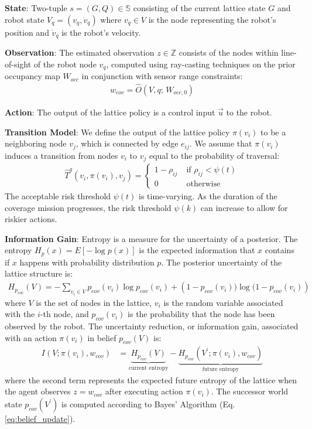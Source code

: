 \documentclass{article}
\newcommand{\ph}[1]{{\textbf{#1}:}} %
\begin{document}
\ph{State} Two-tuple $s=(G, Q)  \in \mathbb{S}$ consisting of the current lattice state $G$ and robot state $V_q = (v_q, \dot{v}_q)$ where $v_q \in V$ is the node representing the robot's position and $\dot{v}_q$ is the robot's velocity. 

\ph{Observation} The estimated observation $z \in \mathbb{Z}$ consists of the nodes within line-of-sight of the robot node $v_q$, computed using ray-casting techniques on the prior occupancy map $W_{occ}$ in conjunction with sensor range constraints:
\begin{align}
    w_{cov} = \hat{O}(V, q; \, W_{occ,0}) 
\end{align}

\ph{Action} The output of the lattice policy is a control input $\vec{u}$ to the robot. 

\ph{Transition Model} We define the output of the lattice policy $\pi(v_i)$ to be a neighboring node $v_j$, which is connected by edge $e_{ij}$. We assume that $\pi(v_i)$ induces a transition from nodes $v_i$ to $v_j$ equal to the probability of traversal:
\begin{align}
    \hat{T}^{g} (v_i, \pi(v_i), v_j) = \begin{cases} 
    1-\rho_{ij} \; &\text{if $\rho_{ij} < \psi(t)$}\\
    0 \; &\text{otherwise}
    \end{cases}
\end{align}
The acceptable risk threshold $\psi(t)$ is time-varying. As the duration of the coverage mission progresses, the risk threshold $\psi(k)$ can increase to allow for riskier actions.

\ph{Information Gain} Entropy is a measure for the uncertainty of a posterior. The entropy $H_p(x) = E[-\log p(x)]$ is the expected information that $x$ contains if $x$ happens with probability distribution $p$. The posterior uncertainty of the lattice structure is:
\begin{align}
    H_{p_{cov}}(V) = -\sum_{v_i \in V}p_{cov}(v_i) \log p_{cov}(v_i) + \left(1-p_{cov}(v_i)) \log (1-p_{cov}(v_i)\right)
\end{align}
where $V$ is the set of nodes in the lattice, $v_i$ is the random variable associated with the $i$-th node, and $p_{cov}(v_i)$ is the probability that the node has been observed by the robot. The uncertainty reduction, or information gain, associated with an action $\pi(v_i)$ in belief $p_{cov}(V)$ is:
\begin{align}
    I(V; \pi(v_i), w_{cov}) &= \underbrace{H_{p_{cov}}(V)}_\text{current entropy} - \underbrace{H_{p_{cov}}(V^\prime; \pi(v_i), w_{cov})}_\text{future entropy}
\end{align}
where the second term represents the expected future entropy of the lattice when the agent observes $z = w_{cov}$ after executing action $\pi(v_i)$. The successor world state $p_{cov}(V^\prime)$ is computed according to Bayes' Algorithm (Eq. \ref{eq:belief_update}). 
\end{document}
